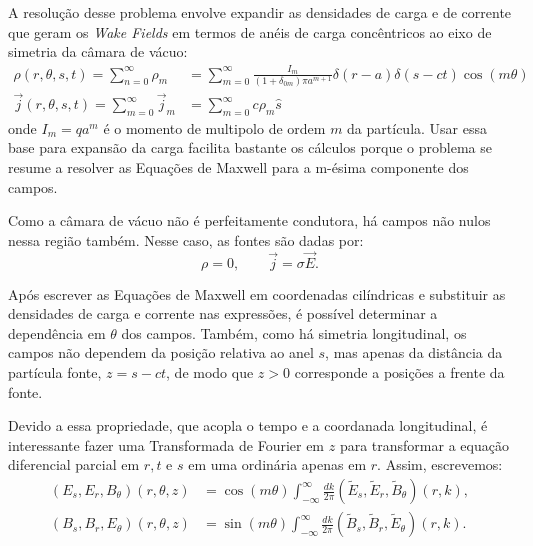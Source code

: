 A resolução desse problema envolve expandir as densidades de carga e de corrente que geram os \textit{Wake Fields} em termos de anéis de carga  concêntricos ao eixo de simetria da câmara de vácuo:
\begin{align}
\rho(r,\theta,s,t)  = \sum_{n=0}^\infty \rho_m &=  \sum_{m=0}^\infty
\frac{I_m}{(1+\delta_{0m})\pi a^{m+1}} \delta(r-a) \delta(s-ct) \cos(m\theta)\\
\vec{j}(r,\theta,s,t) = \sum_{m=0}^\infty\vec{j}_m &=\sum_{m=0}^\infty c \rho_m
\hat{s}
\end{align}
onde $I_m = q a^m$ é o momento de multipolo de ordem $m$ da partícula. Usar essa base para expansão da carga facilita bastante os cálculos porque o problema se resume a resolver as Equações de Maxwell para a m-ésima componente dos campos.

Como a câmara de vácuo não é perfeitamente condutora, há campos não nulos nessa região também. Nesse caso, as fontes são dadas por:
\begin{equation}
 \rho = 0, \qquad \vec{j} = \sigma \vec{E}.
\end{equation}

Após escrever as Equações de Maxwell em coordenadas cilíndricas e substituir as densidades de carga e corrente nas expressões, é possível determinar a dependência em $\theta$ dos campos. Também, como há simetria longitudinal, os campos não dependem da posição relativa ao anel $s$, mas apenas da distância da partícula fonte, $z=s-ct$, de modo que $z>0$ corresponde a posições a frente da fonte.

Devido a essa propriedade, que acopla o tempo e a coordanada longitudinal, é interessante fazer uma Transformada de Fourier em $z$ para transformar a equação diferencial parcial em $r,t$ e $s$ em uma ordinária apenas em $r$. Assim, escrevemos:
\begin{align}
 (E_s,E_r,B_\theta)(r,\theta,z) &= \cos(m\theta)
\int_{-\infty}^\infty\!\!\frac{dk}{2\pi}(\tilde{E}_s,\tilde{E}_r,\tilde{B} _\theta)(r,k),\\
 (B_s,B_r,E_\theta)(r,\theta,z) &= \sin(m\theta)
\int_{-\infty}^\infty\!\!\frac{dk}{2\pi}(\tilde{B}_s,\tilde{B}_r,\tilde{E} _\theta)(r,k).
\end{align}

